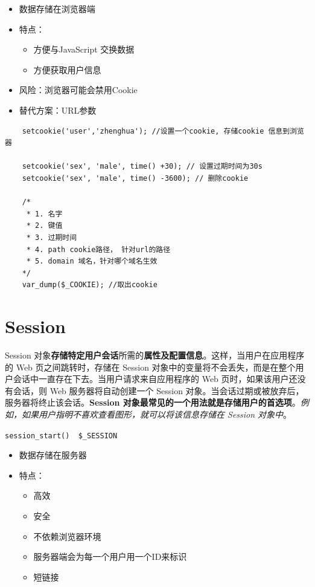 \documentclass[UTF8,a4paper,12pt]{ctexbook}
\begin{document}
		\begin{itemize}
			\item 数据存储在浏览器端
			\item 特点：
				\begin{itemize}
					\item 方便与JavaScript 交换数据
					\item 方便获取用户信息
				\end{itemize}
			\item 风险：浏览器可能会禁用Cookie
			\item 替代方案：URL参数
		\end{itemize}
		
		\begin{lstlisting}
	setcookie('user','zhenghua'); //设置一个cookie, 存储cookie 信息到浏览器
	
	setcookie('sex', 'male', time() +30); // 设置过期时间为30s
	setcookie('sex', 'male', time() -3600); // 删除cookie
	
	/*
	 * 1. 名字
	 * 2. 键值
	 * 3. 过期时间
	 * 4. path cookie路径， 针对url的路径
	 * 5. domain 域名，针对哪个域名生效
	*/
	var_dump($_COOKIE); //取出cookie
		\end{lstlisting}
		
	\section{Session}
		Session 对象\textbf{存储特定用户会话}所需的\textbf{属性及配置信息}。这样，当用户在应用程序的 Web 页之间跳转时，存储在 Session 对象中的变量将不会丢失，而是在整个用户会话中一直存在下去。当用户请求来自应用程序的 Web 页时，如果该用户还没有会话，则 Web 服务器将自动创建一个 Session 对象。当会话过期或被放弃后，服务器将终止该会话。\textbf{Session 对象最常见的一个用法就是存储用户的首选项}。\textit{例如，如果用户指明不喜欢查看图形，就可以将该信息存储在 Session 对象中}。
		
		\verb|session_start()  $_SESSION|
		\begin{itemize}
			\item 数据存储在服务器
			\item 特点：
				\begin{itemize}
					\item 高效
					\item 安全
					\item 不依赖浏览器环境
					\item 服务器端会为每一个用户用一个ID来标识
					\item 短链接
				\end{itemize}
		\end{itemize}
		
\end{document}
